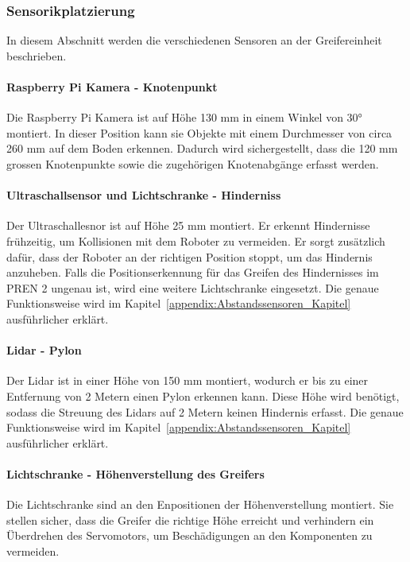 \documentclass[main.tex]{subfiles} %
\begin{document}
\newpage

\subsubsection*{Sensorikplatzierung}

In diesem Abschnitt werden die verschiedenen Sensoren an der Greifereinheit beschrieben.

\paragraph{Raspberry Pi Kamera - Knotenpunkt}
Die Raspberry Pi Kamera ist auf Höhe 130 mm in einem Winkel von 30° montiert.
In dieser Position kann sie Objekte mit einem Durchmesser von circa 260 mm auf dem Boden erkennen.
Dadurch wird sichergestellt, dass die 120 mm grossen Knotenpunkte sowie die zugehörigen
Knotenabgänge erfasst werden.


\paragraph{Ultraschallsensor und Lichtschranke - Hinderniss}
Der Ultraschallesnor ist auf Höhe 25 mm montiert. Er erkennt Hindernisse frühzeitig,
um Kollisionen mit dem Roboter zu vermeiden. Er sorgt zusätzlich dafür, dass der Roboter an der richtigen 
Position stoppt, um das Hindernis anzuheben. Falls die Positionserkennung für das Greifen 
des Hindernisses im PREN 2 ungenau ist, wird eine weitere Lichtschranke eingesetzt.
Die genaue Funktionsweise wird im Kapitel~\ref{appendix:Abstandssensoren_Kapitel} ausführlicher erklärt.

\paragraph{Lidar - Pylon}
Der Lidar ist in einer Höhe von 150 mm montiert, wodurch er bis zu einer Entfernung
von 2 Metern einen Pylon erkennen kann. Diese Höhe wird benötigt, sodass die Streuung des Lidars auf 2 Metern keinen
Hindernis erfasst. Die genaue Funktionsweise wird im Kapitel~\ref{appendix:Abstandssensoren_Kapitel} ausführlicher erklärt.

\paragraph{Lichtschranke - Höhenverstellung des Greifers}

Die Lichtschranke sind an den Enpositionen der Höhenverstellung montiert.
Sie stellen sicher, dass die Greifer die richtige Höhe erreicht und verhindern
ein Überdrehen des Servomotors, um Beschädigungen an den Komponenten zu vermeiden.
\end{document}
